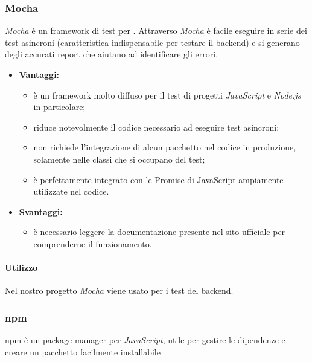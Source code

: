 		\subsubsection{Mocha}
		\textit{Mocha} è un framework di test per . Attraverso \textit{Mocha} è facile eseguire in serie dei test asincroni (caratteristica indispensabile per testare il backend) e si generano degli accurati report che aiutano ad identificare gli errori.

			\begin{itemize}
				\item \textbf{Vantaggi:}
					\begin{itemize}
						\item è un framework molto diffuso per il test di progetti \textit{JavaScript} e \textit{Node.js} in particolare;
						\item riduce notevolmente il codice necessario ad eseguire test asincroni;
						\item non richiede l'integrazione di alcun pacchetto nel codice in produzione, solamente nelle classi che si occupano del test;
						\item è perfettamente integrato con le Promise di JavaScript ampiamente utilizzate nel codice.
					\end{itemize}
				\item \textbf{Svantaggi:}
					\begin{itemize}
						\item è necessario leggere la documentazione presente nel sito ufficiale per comprenderne il funzionamento.
					\end{itemize}
			\end{itemize}
			\paragraph{Utilizzo}
			Nel nostro progetto \textit{Mocha} viene usato per i test del backend.


			\subsubsection{npm}
			npm è un package manager per \textit{JavaScript}, utile per gestire le dipendenze e creare un pacchetto facilmente installabile


